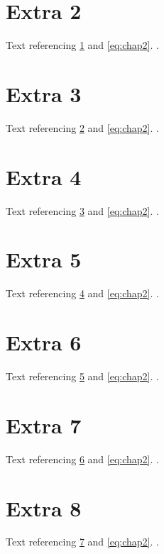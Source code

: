 \section{Extra 2}\label{sec:x2}Text referencing \cref{sec:x2} and \cref{eq:chap2}. \citet{turing36}.
\section{Extra 3}\label{sec:x3}Text referencing \cref{sec:x3} and \cref{eq:chap2}. \citet{turing36}.
\section{Extra 4}\label{sec:x4}Text referencing \cref{sec:x4} and \cref{eq:chap2}. \citet{turing36}.
\section{Extra 5}\label{sec:x5}Text referencing \cref{sec:x5} and \cref{eq:chap2}. \citet{turing36}.
\section{Extra 6}\label{sec:x6}Text referencing \cref{sec:x6} and \cref{eq:chap2}. \citet{turing36}.
\section{Extra 7}\label{sec:x7}Text referencing \cref{sec:x7} and \cref{eq:chap2}. \citet{turing36}.
\section{Extra 8}\label{sec:x8}Text referencing \cref{sec:x8} and \cref{eq:chap2}. \citet{turing36}.
